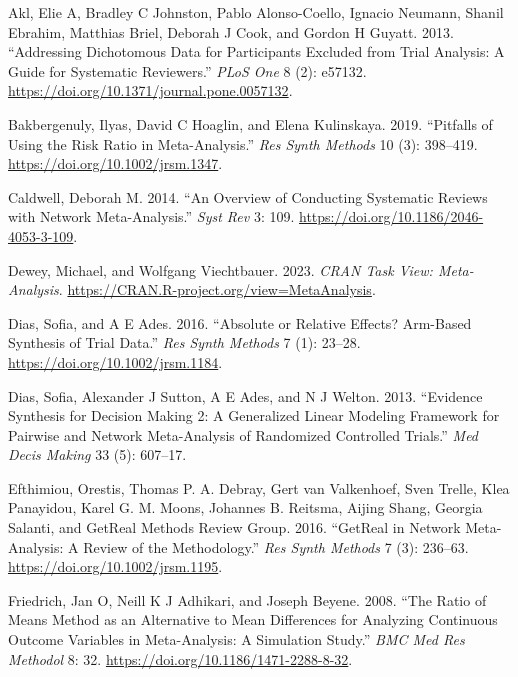 \hypertarget{refs}{}
\begin{CSLReferences}{1}{0}
\leavevmode{}%
Akl, Elie A, Bradley C Johnston, Pablo Alonso-Coello, Ignacio Neumann, Shanil Ebrahim, Matthias Briel, Deborah J Cook, and Gordon H Guyatt. 2013. {``Addressing Dichotomous Data for Participants Excluded from Trial Analysis: A Guide for Systematic Reviewers.''} \emph{PLoS One} 8 (2): e57132. \url{https://doi.org/10.1371/journal.pone.0057132}.

\leavevmode{}%
Bakbergenuly, Ilyas, David C Hoaglin, and Elena Kulinskaya. 2019. {``Pitfalls of Using the Risk Ratio in Meta-Analysis.''} \emph{Res Synth Methods} 10 (3): 398--419. \url{https://doi.org/10.1002/jrsm.1347}.

\leavevmode{}%
Caldwell, Deborah M. 2014. {``An Overview of Conducting Systematic Reviews with Network Meta-Analysis.''} \emph{Syst Rev} 3: 109. \url{https://doi.org/10.1186/2046-4053-3-109}.

\leavevmode{}%
Dewey, Michael, and Wolfgang Viechtbauer. 2023. \emph{{CRAN Task View}: Meta-Analysis}. \url{https://CRAN.R-project.org/view=MetaAnalysis}.

\leavevmode{}%
Dias, Sofia, and A E Ades. 2016. {``Absolute or Relative Effects? Arm-Based Synthesis of Trial Data.''} \emph{Res Synth Methods} 7 (1): 23--28. \url{https://doi.org/10.1002/jrsm.1184}.

\leavevmode{}%
Dias, Sofia, Alexander J Sutton, A E Ades, and N J Welton. 2013. {``Evidence Synthesis for Decision Making 2: A Generalized Linear Modeling Framework for Pairwise and Network Meta-Analysis of Randomized Controlled Trials.''} \emph{Med Decis Making} 33 (5): 607--17.

\leavevmode{}%
Efthimiou, Orestis, Thomas P. A. Debray, Gert van Valkenhoef, Sven Trelle, Klea Panayidou, Karel G. M. Moons, Johannes B. Reitsma, Aijing Shang, Georgia Salanti, and GetReal Methods Review Group. 2016. {``GetReal in Network Meta-Analysis: A Review of the Methodology.''} \emph{Res Synth Methods} 7 (3): 236--63. \url{https://doi.org/10.1002/jrsm.1195}.

\leavevmode{}%
Friedrich, Jan O, Neill K J Adhikari, and Joseph Beyene. 2008. {``The Ratio of Means Method as an Alternative to Mean Differences for Analyzing Continuous Outcome Variables in Meta-Analysis: A Simulation Study.''} \emph{BMC Med Res Methodol} 8: 32. \url{https://doi.org/10.1186/1471-2288-8-32}.


\end{CSLReferences}
